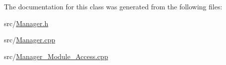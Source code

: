 The documentation for this class was generated from the following files\+:\begin{DoxyCompactItemize}
\item 
src/\hyperlink{_manager_8h}{Manager.\+h}\item 
src/\hyperlink{_manager_8cpp}{Manager.\+cpp}\item 
src/\hyperlink{_manager___module___access_8cpp}{Manager\+\_\+\+Module\+\_\+\+Access.\+cpp}\end{DoxyCompactItemize}
